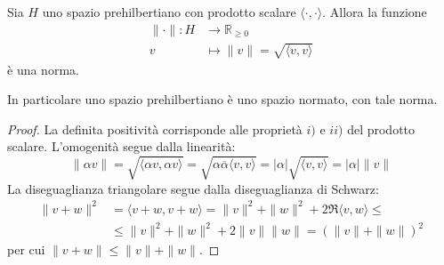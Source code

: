\begin{proposition}
    Sia \(H\) uno spazio prehilbertiano con prodotto scalare \(\langle \cdot,
    \cdot \rangle\). Allora la funzione
    \begin{align*}
        \|\cdot \|: H &\longrightarrow \mathbb{R}_{\ge 0}  \\
        v &\longmapsto \|v \| = \sqrt{\langle v, v \rangle}
    \end{align*}
    è una norma.

    In particolare uno spazio prehilbertiano è uno spazio normato, con tale
    norma.
\end{proposition}
\begin{proof}
    La definita positività corrisponde alle proprietà \(i)\) e \(ii)\) del
    prodotto scalare.
    L'omogenità segue dalla linearità:
    \[
        \|\alpha v\| = \sqrt{\langle \alpha v, \alpha v \rangle} = \sqrt{\alpha
        \overline{\alpha} \langle v, v \rangle} = |\alpha| \sqrt{\langle v, v
        \rangle} = |\alpha| \|v\|
    \]
    La diseguaglianza triangolare segue dalla diseguaglianza di Schwarz:
    \begin{align*}
        \|v + w\|^{2} &= \langle v + w, v + w \rangle = \|v\|^{2} + \|w\|^{2} +
        2\Re\langle v, w \rangle \le \\ &\le  \|v\|^{2} + \|w\|^{2} + 2\|v\|\|w\| = {\left(
        \|v\| + \|w\| \right)}^{2}
    \end{align*}
    per cui \(\|v + w\| \le \|v\| + \|w\|\).
\end{proof}



